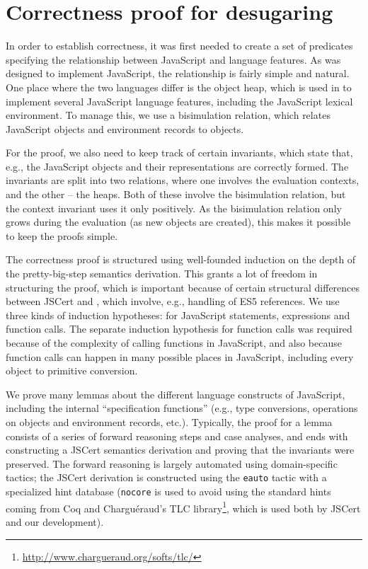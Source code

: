 \documentclass{sigplanconf}
\begin{document}
\section{Correctness proof for \lambdajs{} desugaring}

In order to establish correctness, it was first needed to create
a set of predicates specifying the relationship between 
JavaScript and \lambdajs{} language features. As \lambdajs{} was
designed to implement JavaScript, the relationship is fairly
simple and natural. One place where the two languages differ
is the object heap, which is used in \lambdajs{} to implement
several JavaScript language features, including the
JavaScript lexical environment. To manage this, we use a bisimulation
relation, which relates JavaScript objects and environment records
to \lambdajs{} objects.

For the proof, we also need to keep track of certain invariants,
which state that, e.g., the JavaScript objects and their
\lambdajs{} representations are correctly formed. 
The invariants are split into two relations, where one
involves the evaluation contexts, and the other -- the heaps.
Both of these involve the bisimulation relation, but the
context invariant uses it only positively. As the bisimulation
relation only grows during the evaluation (as new objects
are created), this makes it possible to keep the proofs simple.

The correctness proof is structured using well-founded 
induction on the depth of the \lambdajs{} pretty-big-step
semantics derivation. This grants a lot of freedom in structuring
the proof, which is important because of certain structural
differences between JSCert and \lambdajs{}, which involve,
e.g., handling of ES5 references. We use three kinds of induction
hypotheses: for JavaScript statements, expressions and
function calls. The separate induction hypothesis for function
calls was required because of the complexity of calling functions
in JavaScript, and also because function calls can happen in
many possible places in JavaScript, including every
object to primitive conversion.

We prove many lemmas about the different language constructs
of JavaScript, including the internal ``specification functions''
(e.g., type conversions, operations on objects and environment
records, etc.). Typically, the proof for a lemma consists of
a series of forward reasoning steps and case analyses, and ends with
constructing a JSCert semantics derivation and proving that
the invariants were preserved. The forward reasoning is largely
automated using domain-specific tactics; the JSCert derivation
is constructed using the \texttt{eauto} tactic with a specialized
hint database (\texttt{nocore} is used to avoid using the standard
hints coming from Coq and Chargu\'eraud's TLC
library\footnote{\url{http://www.chargueraud.org/softs/tlc/}}, which is
used both by JSCert and our development).
\end{document}
